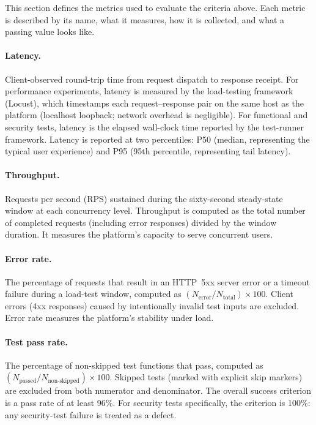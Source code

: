 \documentclass[a4paper,noexaminfo]{sapthesis}
\begin{document}
This section defines the metrics used to evaluate the criteria above.
Each metric is described by its name, what it measures, how it is
collected, and what a passing value looks like.

\paragraph{Latency.}
Client-observed round-trip time from request dispatch to response
receipt.  For performance experiments, latency is measured by the
load-testing framework (Locust), which timestamps each request--response
pair on the same host as the platform (localhost loopback; network
overhead is negligible).  For functional and security tests, latency is
the elapsed wall-clock time reported by the test-runner framework.
Latency is reported at two percentiles: P50 (median, representing the
typical user experience) and P95 (95th percentile, representing tail
latency).

\paragraph{Throughput.}
Requests per second (RPS) sustained during the sixty-second steady-state
window at each concurrency level.  Throughput is computed as the total
number of completed requests (including error responses) divided by the
window duration.  It measures the platform's capacity to serve concurrent
users.

\paragraph{Error rate.}
The percentage of requests that result in an HTTP~5xx server error or a
timeout failure during a load-test window, computed as
$(N_{\text{error}} / N_{\text{total}}) \times 100$.  Client errors
(4xx responses) caused by intentionally invalid test inputs are excluded.
Error rate measures the platform's stability under load.

\paragraph{Test pass rate.}
The percentage of non-skipped test functions that pass, computed as
$(N_{\text{passed}} / N_{\text{non-skipped}}) \times 100$.  Skipped
tests (marked with explicit skip markers) are excluded from both
numerator and denominator.  The overall success criterion is a pass rate
of at least 96\%.  For security tests specifically, the criterion is
100\%: any security-test failure is treated as a defect.
\end{document}

